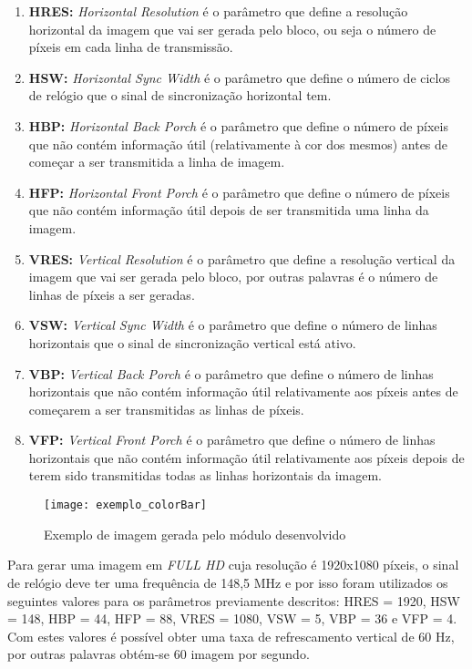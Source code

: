 \begin{enumerate}
	\item \textbf{HRES:} \textit{Horizontal Resolution} é o parâmetro que define a resolução horizontal da imagem que vai ser gerada pelo bloco, ou seja o número de píxeis em cada linha de transmissão.
	\item \textbf{HSW:} \textit{Horizontal Sync Width} é o parâmetro que define o número de ciclos de relógio que o sinal de sincronização horizontal tem.
	\item \textbf{HBP:} \textit{Horizontal Back Porch} é o parâmetro que define o número de píxeis que não contém informação útil (relativamente à cor dos mesmos) antes de começar a ser transmitida a linha de imagem.
	\item \textbf{HFP:} \textit{Horizontal Front Porch} é o parâmetro que define o número de píxeis que não contém informação útil depois de ser transmitida uma linha da imagem.
	\item \textbf{VRES:} \textit{Vertical Resolution} é o parâmetro que define a resolução vertical da imagem que vai ser gerada pelo bloco, por outras palavras é o número de linhas de píxeis a ser geradas.
	\item \textbf{VSW:} \textit{Vertical Sync Width} é o parâmetro que define o número de linhas horizontais que o sinal de sincronização vertical está ativo.
	\item \textbf{VBP:} \textit{Vertical Back Porch} é o parâmetro que define o número de linhas horizontais que não contém informação útil relativamente aos píxeis antes de começarem a ser transmitidas as linhas de píxeis.
	\item \textbf{VFP:} \textit{Vertical Front Porch} é o parâmetro que define o número de linhas horizontais que não contém informação útil relativamente aos píxeis depois de terem sido transmitidas todas as linhas horizontais da imagem.
\end{enumerate}
	
\begin{figure}[h!]
	\begin{center}
		\leavevmode
		\texttt{[image: exemplo\_colorBar]}
		\caption{Exemplo de imagem gerada pelo módulo desenvolvido}
		\label{fig:colorBar_exemple}
	\end{center}
\end{figure}

Para gerar uma imagem em \textit{FULL HD} cuja resolução é 1920x1080 píxeis, o sinal de relógio deve ter uma frequência de 148,5 MHz e por isso foram utilizados os seguintes valores para os parâmetros previamente descritos: HRES = 1920, HSW = 148, HBP = 44, HFP = 88,  VRES = 1080, VSW = 5, VBP = 36 e VFP = 4. Com estes valores é possível obter uma taxa de refrescamento vertical de 60 Hz, por outras palavras obtém-se 60 imagem por segundo.

